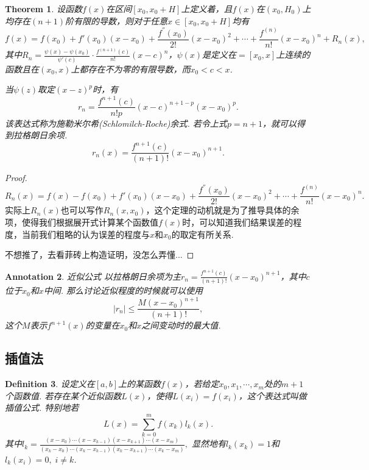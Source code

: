 \documentclass{article}
\newtheorem{theorem}{Theorem}[section]
\newtheorem{definition}[theorem]{Definition}
\newtheorem{annotation}[theorem]{Annotation}
\begin{document}
\begin{theorem}
\rm 设函数$f(x)$在区间$[x_0, x_0 + H]$上定义着，且$f(x)$在$(x_0,H_0)$上均存在$(n+1)$阶有限的导数，则对于任意$x \in [x_0,x_0+H]$均有
$$
f(x) = f(x_0) + f'(x_0)(x-x_0) + \frac{f^{''}(x_0)}{2!}(x-x_0)^2 + \cdots + \frac{f^{(n)}}{n!}(x-x_0)^n + R_n(x),
$$
其中$R_n = \frac{\psi(x) -\psi(x_0)}{\psi'(c)}\cdot \frac{f^{(n+1)}(c)}{n!}(x-c)^n$，$\psi(x)$是定义在$=[x_0,x]$上连续的函数且在$(x_0,x)$上都存在不为零的有限导数，而$x_0 < c < x$. 

当$\psi(z)$取定$(x-z)^p$时，有
$$
r_n = \frac{f^{n+1}(c)}{n!p}(x-c)^{n+1-p}(x-x_0)^p.
$$
该表达式称为{\color{red}施勒米尔希(Schlomilch-Roche)余式}. 若令上式$p=n+1$，就可以得到{\color{red}拉格朗日余项}.
$$
r_n(x) = \frac{f^{n+1}(c)}{(n+1)!}(x-x_0)^{n+1}.
$$
\end{theorem}

\begin{proof}
$$
R_n(x) = f(x) - f(x_0) + f'(x_0)(x-x_0) + \frac{f^{''}(x_0)}{2!}(x-x_0)^2 + \cdots + \frac{f^{(n)}}{n!}(x-x_0)^n.
$$
实际上$R_n(x)$也可以写作$R_n(x,x_0)$，这个定理的动机就是为了推导具体的余项，使得我们根据展开式计算某个函数值$f(x)$时，可以知道我们结果误差的程度，当前我们粗略的认为误差的程度与$x$和$x_0$的取定有所关系. 

不想推了，去看菲砖上构造证明，没怎么弄懂...
\end{proof}

\begin{annotation}
\rm {\color{red} 近似公式} 以拉格朗日余项为主$r_n = \frac{f^{n+1}(c)}{(n+1)!}(x-x_0)^{n+1}$，其中$c$位于$x_0$和$x$中间. 那么讨论近似程度的时候就可以使用
$$
|r_n| \leq \frac{M(x-x_0)^{n+1}}{(n+1)!},
$$
这个$M$表示$f^{n+1}(x)$的变量在$x_0$和$x$之间变动时的最大值. 
\end{annotation}

\subsection{插值法}

\begin{definition}
\rm 设定义在$[a,b]$上的某函数$f(x)$，若给定$x_0,x_1,\cdots,x_m$处的$m+1$个函数值. 若存在某个近似函数$L(x)$，使得$L(x_i) = f(x_i)$，这个表达式叫做{\color{red}插值公式}. 特别地若
$$
L(x) = \sum\limits_{k=0}^m f(x_k)l_k(x).
$$
其中$l_k = \frac{(x-x_0)\cdots(x-x_{k-1})(x-x_{k+1})\cdots(x-x_m)}{(x_k-x_0)\cdots(x_k-x_{k-1})(x_k-x_{k+1})\cdots(x_k-x_m)},$ 显然地有$l_k(x_k) = 1$和$l_k(x_i) = 0,\;i \neq k$.
\end{definition}
\end{document}
